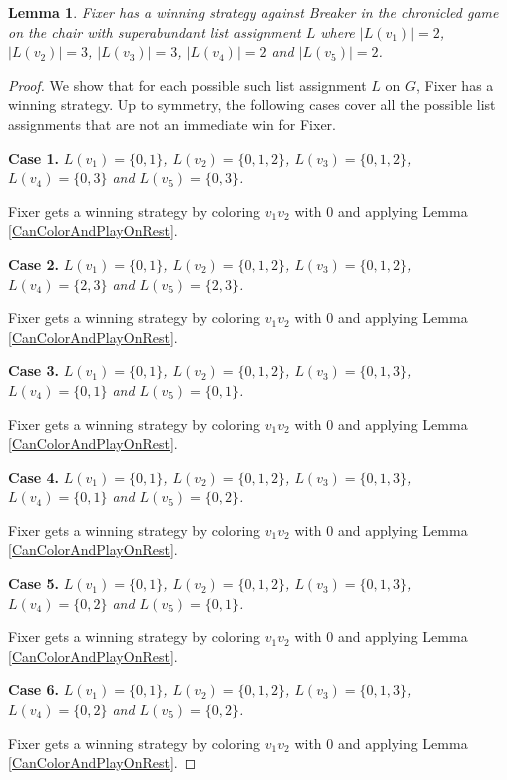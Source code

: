 \documentclass[12pt]{amsart}
\theoremstyle{plain}
\newtheorem{lem}[thm]{Lemma}
\theoremstyle{definition}
\theoremstyle{remark}
\begin{document}
\begin{lem}\label{chair}
Fixer has a winning strategy against Breaker in the chronicled game on the chair with superabundant list assignment $L$ where $|L(v_1)| = 2$, $|L(v_2)| = 3$, $|L(v_3)| = 3$, $|L(v_4)| = 2$ and $|L(v_5)| = 2$.
\end{lem}
\begin{proof}
We show that for each possible such list assignment $L$ on $G$, Fixer has a winning strategy.
Up to symmetry, the following cases cover all the possible list assignments that are not an immediate win for Fixer.

\noindent\textbf{Case 1.  }\textit{$L(v_1) = \{0, 1\}$, $L(v_2) = \{0, 1, 2\}$, $L(v_3) = \{0, 1, 2\}$, $L(v_4) = \{0, 3\}$ and $L(v_5) = \{0, 3\}$.}

Fixer gets a winning strategy by coloring $v_1v_2$ with $0$ and applying Lemma \ref{CanColorAndPlayOnRest}.

\noindent\textbf{Case 2.  }\textit{$L(v_1) = \{0, 1\}$, $L(v_2) = \{0, 1, 2\}$, $L(v_3) = \{0, 1, 2\}$, $L(v_4) = \{2, 3\}$ and $L(v_5) = \{2, 3\}$.}

Fixer gets a winning strategy by coloring $v_1v_2$ with $0$ and applying Lemma \ref{CanColorAndPlayOnRest}.

\noindent\textbf{Case 3.  }\textit{$L(v_1) = \{0, 1\}$, $L(v_2) = \{0, 1, 2\}$, $L(v_3) = \{0, 1, 3\}$, $L(v_4) = \{0, 1\}$ and $L(v_5) = \{0, 1\}$.}

Fixer gets a winning strategy by coloring $v_1v_2$ with $0$ and applying Lemma \ref{CanColorAndPlayOnRest}.

\noindent\textbf{Case 4.  }\textit{$L(v_1) = \{0, 1\}$, $L(v_2) = \{0, 1, 2\}$, $L(v_3) = \{0, 1, 3\}$, $L(v_4) = \{0, 1\}$ and $L(v_5) = \{0, 2\}$.}

Fixer gets a winning strategy by coloring $v_1v_2$ with $0$ and applying Lemma \ref{CanColorAndPlayOnRest}.

\noindent\textbf{Case 5.  }\textit{$L(v_1) = \{0, 1\}$, $L(v_2) = \{0, 1, 2\}$, $L(v_3) = \{0, 1, 3\}$, $L(v_4) = \{0, 2\}$ and $L(v_5) = \{0, 1\}$.}

Fixer gets a winning strategy by coloring $v_1v_2$ with $0$ and applying Lemma \ref{CanColorAndPlayOnRest}.

\noindent\textbf{Case 6.  }\textit{$L(v_1) = \{0, 1\}$, $L(v_2) = \{0, 1, 2\}$, $L(v_3) = \{0, 1, 3\}$, $L(v_4) = \{0, 2\}$ and $L(v_5) = \{0, 2\}$.}

Fixer gets a winning strategy by coloring $v_1v_2$ with $0$ and applying Lemma \ref{CanColorAndPlayOnRest}.


\end{proof}
\end{document}
